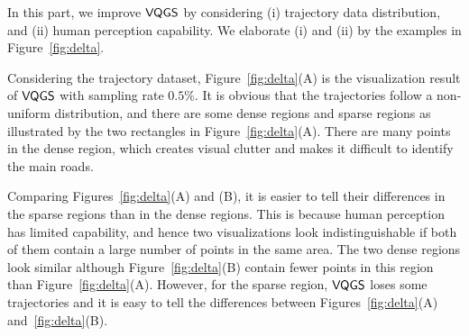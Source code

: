 
In this part, we improve $\mathsf{VQGS}$ by considering (i) trajectory data distribution, and (ii) human perception capability. We elaborate (i) and (ii) by the examples in Figure~\ref{fig:delta}.


 Considering the \pt{} trajectory dataset, Figure~\ref{fig:delta}(A) is the visualization result of $\mathsf{VQGS}$ with sampling rate $0.5\%$.
It is obvious that the trajectories follow a non-uniform distribution, and there are some dense regions and sparse regions as illustrated by the two rectangles in Figure~\ref{fig:delta}(A).
There are many points in the dense region, which creates visual clutter and makes it difficult to identify the main roads.



 Comparing Figures~\ref{fig:delta}(A) and (B), it is easier to tell their differences in the sparse regions than in the dense regions.
This is because human perception has limited capability, and hence two visualizations look indistinguishable if both of them contain a large number of points in the same area.
The two dense regions look similar although Figure~\ref{fig:delta}(B) contain fewer points in this region than Figure~\ref{fig:delta}(A).
However, for the sparse region, $\mathsf{VQGS}$ loses some trajectories and it is easy to tell the differences between Figures~\ref{fig:delta}(A) and~\ref{fig:delta}(B).






